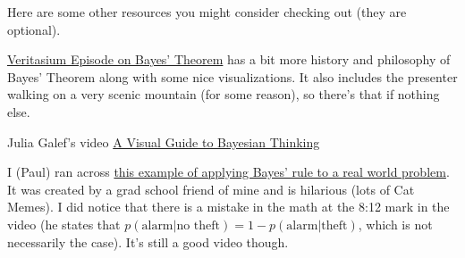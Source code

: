 \documentclass[assignment01_Solutions]{subfiles}
\begin{document}
\begin{externalresources}[(60 minutes)]
 Here are some other resources you might consider checking out (they are optional).
\bi
\item \href{https://www.youtube.com/watch?v=R13BD8qKeTg}{Veritasium Episode on Bayes' Theorem} has a bit more history and philosophy of Bayes' Theorem along with some nice visualizations.  It also includes the presenter walking on a very scenic mountain (for some reason), so there's that if nothing else.
\item Julia Galef's video \href{https://www.youtube.com/watch?v=BrK7X_XlGB8}{A Visual Guide to Bayesian Thinking}
\item I (Paul) ran across \href{https://youtube.com/watch?v=nvqXXlz-rx0}{this example of applying Bayes' rule to a real world problem}.  It was created by a grad school friend of mine and is hilarious (lots of Cat Memes).  I did notice that there is a mistake in the math at the 8:12 mark in the video (he states that $p(\mbox{alarm} | \mbox{no theft}) = 1 - p(\mbox{alarm} | \mbox{theft})$, which is not necessarily the case).  It's still a good video though.
\ei

\end{externalresources}
\end{document}

